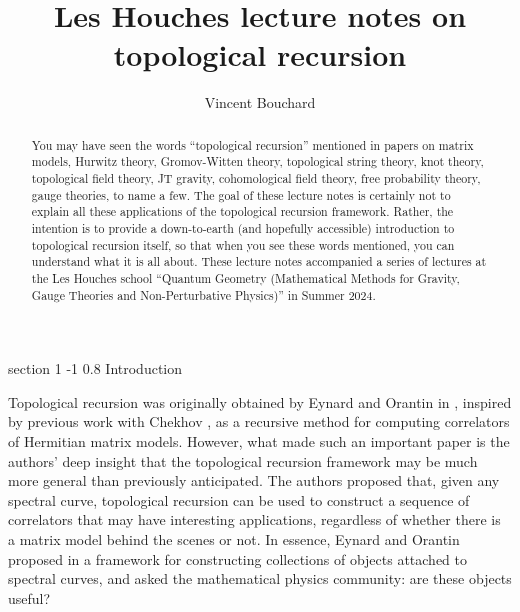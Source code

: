 \documentclass[reqno,oneside,11pt]{amsart}
\makeatletter
\theoremstyle{plain}
\theoremstyle{definition}
\theoremstyle{remark}
\let\frontmatter\relax
\def\mainmatter{\def\baselinestretch{1.1}\normalfont \setlength{\parskip}{0.5em}}
\numberwithin{equation}{section}
\renewcommand{\section}{\@startsection
{section}%
{1}%
{\z@}%
{-1\baselineskip}%
{0.8\baselineskip}%
{\centering\scshape\large}} %
\makeatother
\begin{document}
\frontmatter




\title{Les Houches lecture notes on topological recursion}


\author{Vincent Bouchard}
\address{Department of Mathematical \& Statistical Sciences,
	University of Alberta, 632 CAB\\
	Edmonton, Alberta, Canada T6G 2G1}



\begin{abstract}
You may have seen the words ``topological recursion'' mentioned in papers on matrix models, Hurwitz theory, Gromov-Witten theory, topological string theory, knot theory, topological field theory, JT gravity, cohomological field theory, free probability theory, gauge theories, to name a few. The goal of these lecture notes is certainly not to explain all these applications of the topological recursion framework. Rather, the intention is to provide a down-to-earth (and hopefully accessible) introduction to topological recursion itself, so that when you see these words mentioned, you can understand what it is all about. These lecture notes accompanied a series of lectures at the Les Houches school ``Quantum Geometry (Mathematical Methods for Gravity, Gauge Theories and Non-Perturbative Physics)'' in Summer 2024. 
\end{abstract}

\maketitle
\mainmatter

\section{Introduction}

Topological recursion was originally obtained by Eynard and Orantin in \cite{EO07,EO08}, inspired by previous work with Chekhov \cite{CE06}, as a recursive method for computing correlators of Hermitian matrix models. However, what made \cite{EO07} such an important paper is the authors' deep insight that the topological recursion framework may be much more general than previously anticipated. The authors proposed that, given any spectral curve, topological recursion can be used to construct a sequence of correlators that may have interesting applications, regardless of whether there is a matrix model behind the scenes or not. In essence, Eynard and Orantin proposed in \cite{EO07} a framework for constructing collections of objects attached to spectral curves, and asked the mathematical physics community: are these objects useful?
\end{document}
